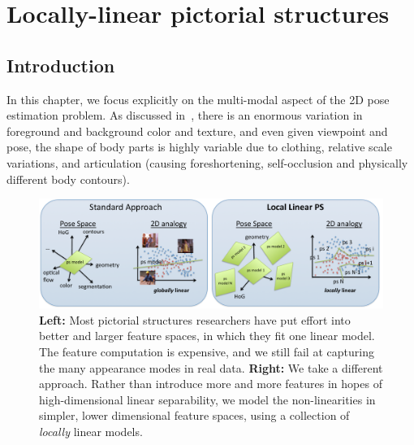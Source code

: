 \chapter{Locally-linear pictorial structures}\label{sec:llps}
\section{Introduction}


In this chapter, we focus explicitly on the multi-modal aspect of the 2D pose 
estimation problem.  As discussed in~, there is an enormous 
variation in foreground and background color and texture, and even given 
viewpoint and pose, the shape of body parts is highly variable due to clothing, 
relative scale variations, and articulation (causing foreshortening, 
self-occlusion and physically different body contours).

\begin{figure}[t!]
\centering
\includegraphics[width=0.99\linewidth]{figs/llps-overview.pdf}
\caption{\label{fig:overview} \textbf{Left:} Most pictorial structures 
researchers have put effort into better and larger feature spaces, in which 
they fit one linear model.  The feature computation is expensive, and we still 
fail at capturing the many appearance modes in real data.  \textbf{Right:} We 
take a different approach.  Rather than introduce more and more features in 
hopes of high-dimensional linear separability, we model the non-linearities in 
simpler, lower dimensional feature spaces, using a collection of {\em locally} 
linear models.}
\end{figure}


